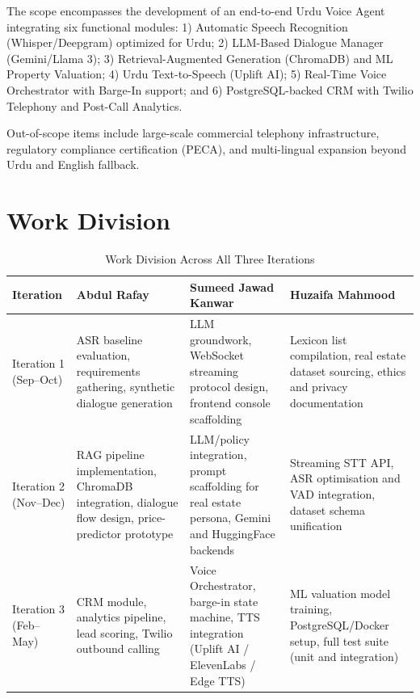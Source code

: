 The scope encompasses the development of an end-to-end Urdu Voice Agent integrating six functional modules: 
1) Automatic Speech Recognition (Whisper/Deepgram) optimized for Urdu; 2) LLM-Based Dialogue Manager (Gemini/Llama 3); 3) Retrieval-Augmented Generation (ChromaDB) and ML Property Valuation; 4) Urdu Text-to-Speech (Uplift AI); 5) Real-Time Voice Orchestrator with Barge-In support; and 6) PostgreSQL-backed CRM with Twilio Telephony and Post-Call Analytics. 

Out-of-scope items include large-scale commercial telephony infrastructure, regulatory compliance certification (PECA), and multi-lingual expansion beyond Urdu and English fallback.

\section{Work Division}

\begin{table}[H]
\centering
\caption{Work Division Across All Three Iterations}
\renewcommand{\arraystretch}{1.3}
\begin{tabular}{|l|p{4.5cm}|p{4.5cm}|p{4.5cm}|}
\hline
\textbf{Iteration} & \textbf{Abdul Rafay} & \textbf{Sumeed Jawad Kanwar} & \textbf{Huzaifa Mahmood} \\ \hline
Iteration 1 (Sep--Oct) & ASR baseline evaluation, requirements gathering, synthetic dialogue generation & LLM groundwork, WebSocket streaming protocol design, frontend console scaffolding & Lexicon list compilation, real estate dataset sourcing, ethics and privacy documentation \\ \hline
Iteration 2 (Nov--Dec) & RAG pipeline implementation, ChromaDB integration, dialogue flow design, price-predictor prototype & LLM/policy integration, prompt scaffolding for real estate persona, Gemini and HuggingFace backends & Streaming STT API, ASR optimisation and VAD integration, dataset schema unification \\ \hline
Iteration 3 (Feb--May) & CRM module, analytics pipeline, lead scoring, Twilio outbound calling & Voice Orchestrator, barge-in state machine, TTS integration (Uplift AI / ElevenLabs / Edge TTS) & ML valuation model training, PostgreSQL/Docker setup, full test suite (unit and integration) \\ \hline
\end{tabular}
\label{tab:work-division}
\end{table}
